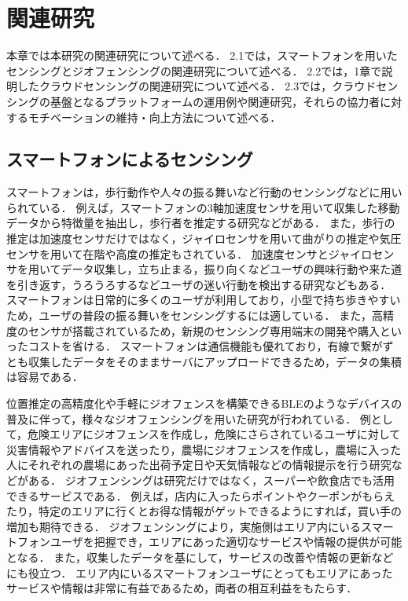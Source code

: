 \thispagestyle{myheadings}
\chapter{関連研究}
\label{sec:format}

本章では本研究の関連研究について述べる．
2.1では，スマートフォンを用いたセンシングとジオフェンシングの関連研究について述べる．
2.2では，1章で説明したクラウドセンシングの関連研究について述べる．
2.3では，クラウドセンシングの基盤となるプラットフォームの運用例や関連研究，それらの協力者に対するモチベーションの維持・向上方法について述べる．

\section{スマートフォンによるセンシング}
\label{sec:format_thesis}
スマートフォンは，歩行動作や人々の振る舞いなど行動のセンシングなどに用いられている．
例えば，スマートフォンの3軸加速度センサを用いて収集した移動データから特徴量を抽出し，歩行者を推定する研究\cite{iwamoto}などがある．
また，歩行の推定は加速度センサだけではなく，ジャイロセンサを用いて曲がりの推定\cite{suzuki}や気圧センサを用いて在階や高度の推定\cite{nami}\cite{yone}もされている．
加速度センサとジャイロセンサを用いてデータ収集し，立ち止まる，振り向くなどユーザの興味行動\cite{nari}や来た道を引き返す，うろうろするなどユーザの迷い行動\cite{taka}を検出する研究などもある．
スマートフォンは日常的に多くのユーザが利用しており，小型で持ち歩きやすいため，ユーザの普段の振る舞いをセンシングするには適している．
また，高精度のセンサが搭載されているため，新規のセンシング専用端末の開発や購入といったコストを省ける．
スマートフォンは通信機能も優れており，有線で繋がずとも収集したデータをそのままサーバにアップロードできるため，データの集積は容易である．

位置推定の高精度化や手軽にジオフェンスを構築できるBLEのようなデバイスの普及に伴って，様々なジオフェンシングを用いた研究が行われている．
例として，危険エリアにジオフェンスを作成し，危険にさらされているユーザに対して災害情報やアドバイスを送ったり\cite{suyama}，農場にジオフェンスを作成し，農場に入った人にそれぞれの農場にあった出荷予定日や天気情報などの情報提示を行う研究\cite{yoshida}などがある．
ジオフェンシングは研究だけではなく，スーパーや飲食店でも活用できるサービスである．
例えば，店内に入ったらポイントやクーポンがもらえたり，特定のエリアに行くとお得な情報がゲットできるようにすれば，買い手の増加も期待できる．
ジオフェンシングにより，実施側はエリア内にいるスマートフォンユーザを把握でき，エリアにあった適切なサービスや情報の提供が可能となる．
また，収集したデータを基にして，サービスの改善や情報の更新などにも役立つ．
エリア内にいるスマートフォンユーザにとってもエリアにあったサービスや情報は非常に有益であるため，両者の相互利益をもたらす．

